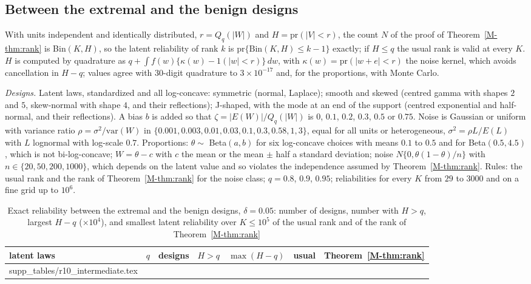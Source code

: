 \documentclass[12pt]{article}
\makeatletter
\newcommand{\tabinput}[1]{\@@input #1 }
\renewcommand{\_}{\usc\allowbreak}
\theoremstyle{definition}
\numberwithin{equation}{section}
\newcommand{\pr}{\mathrm{pr}}
\newcommand{\var}{\mathrm{var}}
\newcommand{\Bin}{\mathrm{Bin}}
\makeatother
\begin{document}
\subsection{Between the extremal and the benign designs}\label{sec:s-intermediate}

With units independent and identically distributed, $r = Q_q(|W|)$ and $H = \pr(|V| < r)$, the count $N$ of the proof of Theorem~\ref{M-thm:rank} is Bin$(K, H)$, so the latent reliability of rank $k$ is $\pr\{\Bin(K, H) \le k - 1\}$ exactly; if $H \le q$ the usual rank is valid at every $K$. $H$ is computed by quadrature as $q + \int f(w)\{\kappa(w) - 1(|w| < r)\}\,dw$, with $\kappa(w) = \pr(|w + e| < r)$ the noise kernel, which avoids cancellation in $H - q$; values agree with $30$-digit quadrature to $3 \times 10^{-17}$ and, for the proportions, with Monte Carlo.

\emph{Designs.} Latent laws, standardized and all log-concave: symmetric (normal, Laplace); smooth and skewed (centred gamma with shapes $2$ and $5$, skew-normal with shape $4$, and their reflections); J-shaped, with the mode at an end of the support (centred exponential and half-normal, and their reflections). A bias $b$ is added so that $\zeta = |E(W)|/Q_q(|W|)$ is $0$, $0.1$, $0.2$, $0.3$, $0.5$ or $0.75$. Noise is Gaussian or uniform with variance ratio $\rho = \sigma^2/\var(W)$ in $\{0.001, 0.003, 0.01, 0.03, 0.1, 0.3, 0.58, 1, 3\}$, equal for all units or heterogeneous, $\sigma^2 = \rho L/E(L)$ with $L$ lognormal with log-scale $0.7$. Proportions: $\theta \sim$ Beta$(a, b)$ for six log-concave choices with means $0.1$ to $0.5$ and for Beta$(0.5, 4.5)$, which is not bi-log-concave; $W = \theta - c$ with $c$ the mean or the mean $\pm$ half a standard deviation; noise $N\{0, \theta(1 - \theta)/n\}$ with $n \in \{20, 50, 200, 1000\}$, which depends on the latent value and so violates the independence assumed by Theorem~\ref{M-thm:rank}. Rules: the usual rank and the rank of Theorem~\ref{M-thm:rank} for the noise class; $q = 0.8$, $0.9$, $0.95$; reliabilities for every $K$ from $29$ to $3000$ and on a fine grid up to $10^6$.

\begin{table}[htbp]
\renewcommand{\baselinestretch}{1}
\caption{Exact reliability between the extremal and the benign designs, $\delta = 0.05$: number of designs, number with $H > q$, largest $H - q$ ($\times 10^{4}$), and smallest latent reliability over $K \le 10^5$ of the usual rank and of the rank of Theorem~\ref{M-thm:rank}}
\label{tab:s-intermediate}
\centering
\fontsize{8}{10pt}\selectfont
\begin{tabular}{llccccc}
\toprule
latent laws & $q$ & designs & $H > q$ & $\max(H - q)$ & usual & Theorem~\ref{M-thm:rank} \\
\midrule
\tabinput{supp_tables/r10_intermediate.tex}
\bottomrule
\end{tabular}
\end{table}
\end{document}
